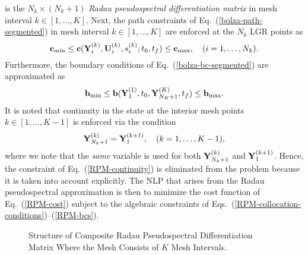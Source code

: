 \documentclass[prodmode,acmtecs]{acmsmall}
\begin{document}
is the $N_k\times (N_k+1)$ {\em Radau pseudospectral differentiation
matrix}\cite{Garg1} in mesh interval $k\in[1,\ldots,K]$. 
Next, the path constraints of Eq.~(\ref{bolza-path-segmented})
in mesh interval $k\in[1,\ldots,K]$ are enforced at the $N_k$ LGR points as   
\begin{equation}\label{RPM-path-constraint}
  \bfc_{\min} \leq  \bfc(\bfY_{i}^{(k)},\bfU_{i}^{(k)},s_{i}^{(k)};t_0,t_f) \leq \bfc_{\max}, \quad (i=1,\ldots,N_k).
\end{equation}
Furthermore, the  boundary conditions of
Eq.~(\ref{bolza-bc-segmented}) are approximated as
\begin{equation} \label{RPM-bcs} 
 \bfb_{\min} \leq \bfb(\bfY_{1}^{(1)},t_0,\bfY_{N_K+1}^{(K)},t_f)  \leq \bfb_{\max}.  
\end{equation} 
It is noted that continuity in the state at the interior mesh points 
$k\in[1,\ldots,K-1]$ is enforced via the condition 
\begin{equation} \label{RPM-continuity}
\bfY_{N_k+1}^{(k)} = \bfY_1^{(k+1)} , \quad (k=1,\ldots,K-1),
\end{equation}
where we note that the {\em same} variable is used for both
$\mathbf{Y}_{N_k+1}^{(k)}$ and $\mathbf{Y}_1^{(k+1)}$.  Hence, the constraint of
Eq.~(\ref{RPM-continuity}) is eliminated from the problem because it
is taken into account explicitly.  The NLP that arises from the Radau
pseudospectral approximation is then to minimize the cost function of 
Eq.~(\ref{RPM-cost}) subject to the algebraic constraints of
Eqs.~(\ref{RPM-collocation-conditions})--(\ref{RPM-bcs}).

\begin{figure}
 \centering
 \caption{Structure of Composite Radau Pseudospectral Differentiation
   Matrix Where the Mesh Consists of $K$ Mesh Intervals.\label{fig:RPMDmatrix}}
\end{figure}



\end{document}
